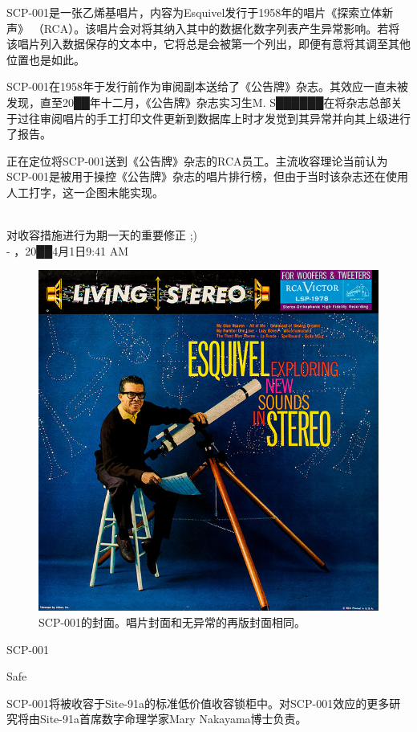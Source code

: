 SCP-001是一张乙烯基唱片，内容为Esquivel发行于1958年的唱片《探索立体新声》 （RCA）。该唱片会对将其纳入其中的数据化数字列表产生异常影响。若将该唱片列入数据保存的文本中，它将总是会被第一个列出，即便有意将其调至其他位置也是如此。

SCP-001在1958年于发行前作为审阅副本送给了《公告牌》杂志。其效应一直未被发现，直至20██年十二月，《公告牌》杂志实习生M. S██████在将杂志总部关于过往审阅唱片的手工打印文件更新到数据库上时才发觉到其异常并向其上级进行了报告。

正在定位将SCP-001送到《公告牌》杂志的RCA员工。主流收容理论当前认为SCP-001是被用于操控《公告牌》杂志的唱片排行榜，但由于当时该杂志还在使用人工打字，这一企图未能实现。


\newpage



\begin{scpbox}
 \\
对收容措施进行为期一天的重要修正 ;) \\
- ，20██4月1日9:41 AM
\end{scpbox}

\begin{figure}[H]
	\centering
	\includegraphics[width=0.5\linewidth]{images/SCP.001.a.record.2.jpg}
	\caption*{SCP-001的封面。唱片封面和无异常的再版封面相同。}
\end{figure}

SCP-001

Safe

SCP-001将被收容于Site-91a的标准低价值收容锁柜中。对SCP-001效应的更多研究将由Site-91a首席数字命理学家Mary Nakayama博士负责。

